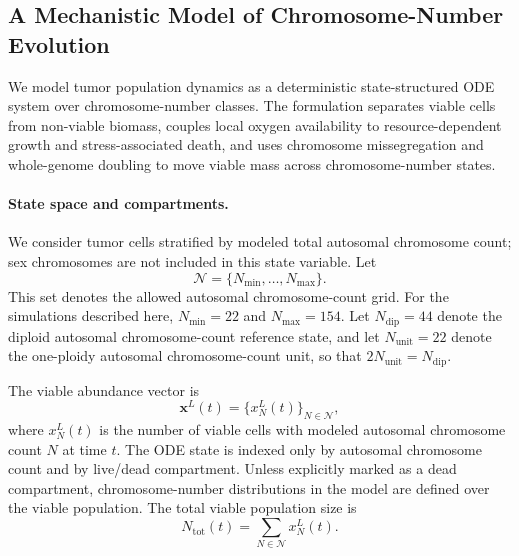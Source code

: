 \documentclass[11pt]{article}
\begin{document}
\subsection{A Mechanistic Model of Chromosome-Number Evolution}
\label{ode}

We model tumor population dynamics as a deterministic state-structured ODE system over chromosome-number classes. The formulation separates viable cells from non-viable biomass, couples local oxygen availability to resource-dependent growth and stress-associated death, and uses chromosome missegregation and whole-genome doubling to move viable mass across chromosome-number states.

\paragraph{State space and compartments.}

We consider tumor cells stratified by modeled total autosomal chromosome count; sex chromosomes are not included in this state variable. Let
\begin{equation}
\mathcal{N}=\{N_{\min},\dots,N_{\max}\}.
\label{eq:appendix_state_grid}
\end{equation}
This set denotes the allowed autosomal chromosome-count grid. For the simulations described here, $N_{\min}=22$ and $N_{\max}=154$. Let $N_{\mathrm{dip}}=44$ denote the diploid autosomal chromosome-count reference state, and let $N_{\mathrm{unit}}=22$ denote the one-ploidy autosomal chromosome-count unit, so that $2N_{\mathrm{unit}}=N_{\mathrm{dip}}$.

The viable abundance vector is
\begin{equation}
\mathbf{x}^L(t)=\{x_N^L(t)\}_{N\in\mathcal N},
\label{eq:appendix_viable_vector}
\end{equation}
where $x_N^L(t)$ is the number of viable cells with modeled autosomal chromosome count $N$ at time $t$. The ODE state is indexed only by autosomal chromosome count and by live/dead compartment. Unless explicitly marked as a dead compartment, chromosome-number distributions in the model are defined over the viable population. The total viable population size is
\begin{equation}
N_{\mathrm{tot}}(t)=\sum_{N\in\mathcal N}x_N^L(t).
\label{eq:appendix_total_viable_population}
\end{equation}
\end{document}
